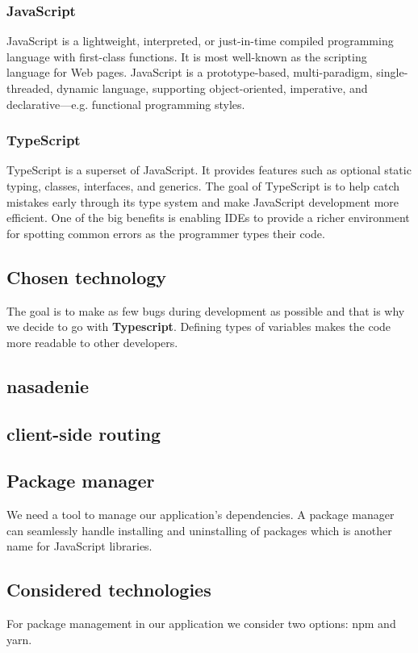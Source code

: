 \subsubsection*{JavaScript}
JavaScript is a lightweight, interpreted, or just-in-time compiled programming language with first-class functions. 
It is most well-known as the scripting language for Web pages. 
JavaScript is a prototype-based, multi-paradigm, single-threaded, dynamic language, supporting object-oriented, imperative, and declarative---e.g. functional programming styles.

\subsubsection*{TypeScript}
TypeScript is a superset of JavaScript. 
It provides features such as optional static typing, classes, interfaces, and generics. 
The goal of TypeScript is to help catch mistakes early through its type system and make JavaScript development more efficient. 
One of the big benefits is enabling IDEs to provide a richer environment for spotting common errors as the programmer types their code.

\subsection*{Chosen technology}
The goal is to make as few bugs during development as possible and that is why we decide to go with \textbf{Typescript}.
Defining types of variables makes the code more readable to other developers.

\subsection{nasadenie}

\subsection{client-side routing}

\subsection{Package manager}
We need a tool to manage our application's dependencies.
A package manager can seamlessly handle installing and uninstalling of packages which is another name for JavaScript libraries.

\subsection*{Considered technologies}
For package management in our application we consider two options: npm and yarn.

